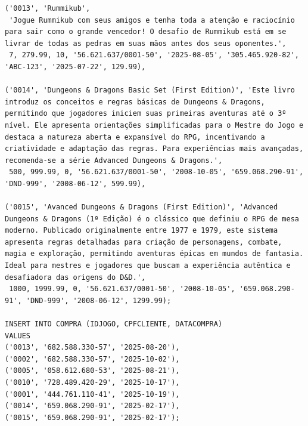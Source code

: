 \documentclass[11pt]{article}
\begin{document}
\begin{Verbatim}[breaklines=true, breakanywhere=true]
('0013', 'Rummikub',
 'Jogue Rummikub com seus amigos e tenha toda a atenção e raciocínio para sair como o grande vencedor! O desafio de Rummikub está em se livrar de todas as pedras em suas mãos antes dos seus oponentes.',
 7, 279.99, 10, '56.621.637/0001-50', '2025-08-05', '305.465.920-82', 'ABC-123', '2025-07-22', 129.99),
 
('0014', 'Dungeons & Dragons Basic Set (First Edition)', 'Este livro introduz os conceitos e regras básicas de Dungeons & Dragons, permitindo que jogadores iniciem suas primeiras aventuras até o 3º nível. Ele apresenta orientações simplificadas para o Mestre do Jogo e destaca a natureza aberta e expansível do RPG, incentivando a criatividade e adaptação das regras. Para experiências mais avançadas, recomenda-se a série Advanced Dungeons & Dragons.',
 500, 999.99, 0, '56.621.637/0001-50', '2008-10-05', '659.068.290-91', 'DND-999', '2008-06-12', 599.99),

('0015', 'Avanced Dungeons & Dragons (First Edition)', 'Advanced Dungeons & Dragons (1ª Edição) é o clássico que definiu o RPG de mesa moderno. Publicado originalmente entre 1977 e 1979, este sistema apresenta regras detalhadas para criação de personagens, combate, magia e exploração, permitindo aventuras épicas em mundos de fantasia. Ideal para mestres e jogadores que buscam a experiência autêntica e desafiadora das origens do D&D.',
 1000, 1999.99, 0, '56.621.637/0001-50', '2008-10-05', '659.068.290-91', 'DND-999', '2008-06-12', 1299.99);

INSERT INTO COMPRA (IDJOGO, CPFCLIENTE, DATACOMPRA) 
VALUES
('0013', '682.588.330-57', '2025-08-20'),
('0002', '682.588.330-57', '2025-10-02'),
('0005', '058.612.680-53', '2025-08-21'),
('0010', '728.489.420-29', '2025-10-17'),
('0001', '444.761.110-41', '2025-10-19'),
('0014', '659.068.290-91', '2025-02-17'),
('0015', '659.068.290-91', '2025-02-17');
\end{Verbatim}
\end{document}
